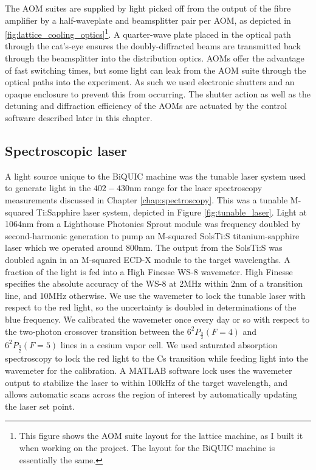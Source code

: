 	The AOM suites are supplied by light picked off from the output of the fibre amplifier by a half-waveplate and beamsplitter pair per AOM, as depicted in \ref{fig:lattice_cooling_optics}\footnote{This figure shows the AOM suite layout for the lattice machine, as I built it when working on the project. The layout for the BiQUIC machine is essentially the same.}. A quarter-wave plate placed in the optical path through the cat's-eye ensures the doubly-diffracted beams are transmitted back through the beamsplitter into the distribution optics. AOMs offer the advantage of fast switching times, but some light can leak from the AOM suite through the optical paths into the experiment. As such we used electronic shutters and an opaque enclosure to prevent this from occurring. The shutter action as well as the detuning and diffraction efficiency of the AOMs are actuated by the control software described later in this chapter. 
	


\subsection*{Spectroscopic laser}
	A light source unique to the BiQUIC machine was the tunable laser system used to generate light in the $402-430$nm range for the laser spectroscopy measurements discussed  in Chapter \ref{chap:spectroscopy}. This  was a tunable M-squared Ti:Sapphire laser system, depicted in Figure \ref{fig:tunable_laser}. Light at 1064nm from a Lighthouse Photonics Sprout module was frequency doubled by second-harmonic generation to pump an M-squared SolsTi:S titanium-sapphire laser which we operated around 800nm. The output from the SolsTi:S was doubled again in an M-squared ECD-X module to the target wavelengths. A fraction of the light is fed into a High Finesse WS-8 wavemeter. High Finesse specifies the absolute accuracy of the WS-8 at 2MHz within 2nm of a transition line, and 10MHz otherwise. We use the wavemeter to lock the tunable laser with respect to the red light, so the uncertainty is doubled in determinations of the blue frequency. We calibrated the wavemeter once every day or so with respect to the two-photon crossover transition between the $6^2P_{\frac{3}{2}} (F=4)$ and $6^2P_{\frac{3}{2}} (F=5)$ lines in a cesium vapor cell. We used saturated absorption spectroscopy to lock the red light to the Cs transition while feeding light into the wavemeter for the calibration.	A MATLAB software lock uses the wavemeter output to stabilize the laser to within 100kHz of the target wavelength, and allows automatic scans across the region of interest by automatically updating the laser set point. 

